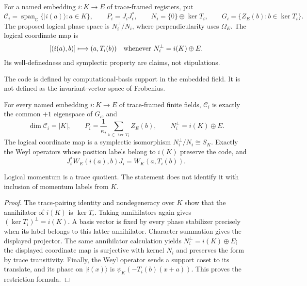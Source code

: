 \begin{definition}
For a named embedding $i:K\to E$ of trace-framed registers, put
\[
 \mathcal C_i=\operatorname{span}_{\mathbb C}
       \{|i(a)\rangle:a\in K\},\qquad P_i=J_iJ_i^*,\qquad
 N_i=\{0\}\oplus\ker T_i,\qquad
 G_i=\{Z_E(b):b\in\ker T_i\}.
\]
The proposed logical phase space is $N_i^\perp/N_i$, where
perpendicularity uses $\Omega_E$.  The logical coordinate map is
\[
 [(i(a),b)]\longmapsto (a,T_i(b))
 \quad\hbox{whenever }N_i^\perp=i(K)\oplus E.
\]
Its well-definedness and symplectic property are claims, not stipulations.
\end{definition}
\begin{scope}
The code is defined by computational-basis support in the embedded field.
It is not defined as the invariant-vector space of Frobenius.
\end{scope}

\begin{theorem}
{\normalfont\statusProved}\quad
For every named embedding $i:K\to E$ of trace-framed finite fields,
$\mathcal C_i$ is exactly the common $+1$ eigenspace of $G_i$, and
\[
 \dim\mathcal C_i=|K|,\qquad
 P_i=\frac1{\kappa_i}\sum_{b\in\ker T_i}Z_E(b),\qquad
 N_i^\perp=i(K)\oplus E.
\]
The logical coordinate map is a symplectic isomorphism
$N_i^\perp/N_i\cong S_K$.  Exactly the Weyl operators whose position
labels belong to $i(K)$ preserve the code, and
\[
 J_i^*W_E(i(a),b)J_i=W_K(a,T_i(b)).
\]
\end{theorem}
\begin{scope}
Logical momentum is a trace quotient.  The statement does not identify
it with inclusion of momentum labels from $K$.
\end{scope}
\begin{proof}
The trace-pairing identity and nondegeneracy over $K$ show that the
annihilator of $i(K)$ is $\ker T_i$.  Taking annihilators again gives
$(\ker T_i)^\perp=i(K)$.  A basis vector is fixed by every phase
stabilizer precisely when its label belongs to this latter annihilator.
Character summation gives the displayed projector.  The same annihilator
calculation yields $N_i^\perp=i(K)\oplus E$; the displayed coordinate
map is surjective with kernel $N_i$ and preserves the form by trace
transitivity.  Finally, the Weyl operator sends a support coset to its
translate, and its phase on $|i(x)\rangle$ is
$\psi_K(-T_i(b)(x+a))$.  This proves the restriction formula.
\end{proof}

